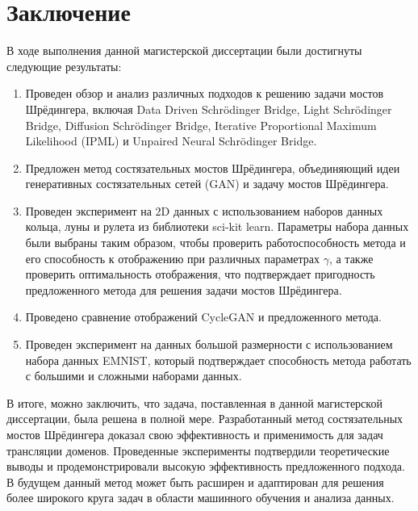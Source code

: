 \section{Заключение}
\label{sec:Chapter6} 

В ходе выполнения данной магистерской диссертации были достигнуты следующие результаты:
\begin{enumerate}
    \item Проведен обзор и анализ различных подходов к решению задачи мостов Шрёдингера, включая Data Driven Schrödinger Bridge, Light Schrödinger Bridge, Diffusion Schrödinger Bridge, Iterative Proportional Maximum Likelihood (IPML) и Unpaired Neural Schrödinger Bridge.
    \item Предложен метод состязательных мостов Шрёдингера, объединяющий идеи генеративных состязательных сетей (GAN) и задачу мостов Шрёдингера.
    \item Проведен эксперимент на 2D данных с использованием наборов данных кольца, луны и рулета из библиотеки sci-kit learn. Параметры набора данных были выбраны таким образом, чтобы проверить работоспособность метода и его способность к отображению при различных параметрах $\gamma$, а также проверить оптимальность отображения, что подтверждает пригодность предложенного метода для решения задачи мостов Шрёдингера.
    \item Проведено сравнение отображений CycleGAN и предложенного метода.
    \item Проведен эксперимент на данных большой размерности с использованием набора данных EMNIST, который подтверждает способность метода работать с большими и сложными наборами данных.
\end{enumerate}

В итоге, можно заключить, что задача, поставленная в данной магистерской диссертации, была решена в полной мере. Разработанный метод состязательных мостов Шрёдингера доказал свою эффективность и применимость для задач трансляции доменов. Проведенные эксперименты подтвердили теоретические выводы и продемонстрировали высокую эффективность предложенного подхода. В будущем данный метод может быть расширен и адаптирован для решения более широкого круга задач в области машинного обучения и анализа данных.

\newpage
